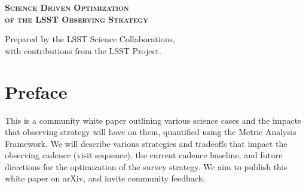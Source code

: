 \documentclass[11pt,headsepline,cleardoubleempty,twoside,openright]{scrbook}
\begin{document}
\begin{titlepage}
\begin{center}


{\Huge\bfseries\scshape
 Science Driven Optimization \\
 of the LSST Observing Strategy}



% 

%
%


{\Large  Prepared by the LSST Science Collaborations,}\\
{\Large with contributions from the LSST Project. }\\

\end{center}
\end{titlepage}


\tableofcontents

\clearemptydoublepage

\chapter*{Preface}
\markboth{}{}

\noindent This is a community white paper outlining various science
cases and the impacts that observing strategy will have on them,
quantified using the Metric Analysis Framework. We will describe
various strategies and tradeoffs that impact the observing cadence
(visit sequence), the current cadence baseline, and future directions
for the optimization of the  survey strategy. We aim to publish this
white paper on arXiv, and invite community feedback.
\end{document}
